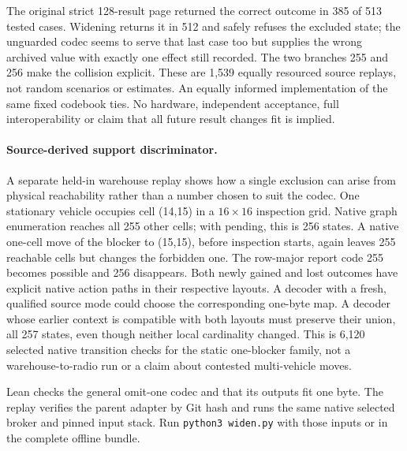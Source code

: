 \documentclass{article}
\begin{document}
The original strict 128-result page returned the correct outcome
in 385 of 513 tested cases. Widening returns it in 512 and safely
refuses the excluded state; the unguarded codec seems to serve that
last case too but supplies the wrong archived value with exactly
one effect still recorded. The two branches 255 and 256 make the
collision explicit. These are 1,539 equally resourced source replays,
not random scenarios or estimates. An equally informed implementation
of the same fixed codebook ties. No hardware, independent acceptance,
full interoperability or claim that all future result changes fit
is implied.

\paragraph{Source-derived support discriminator.}
A separate held-in warehouse replay shows how a single exclusion can
arise from physical reachability rather than a number chosen to suit
the codec. One stationary vehicle occupies cell (14,15) in a
\(16\times16\) inspection grid. Native graph enumeration reaches
all 255 other cells; with pending, this is 256 states. A native
one-cell move of the blocker to (15,15), before inspection starts,
again leaves 255 reachable cells but changes the forbidden one.
The row-major report code 255 becomes possible and 256 disappears.
Both newly gained and lost outcomes have explicit native action
paths in their respective layouts. A decoder with a fresh, qualified
source mode could choose the corresponding one-byte map. A
decoder whose earlier context is compatible with both layouts must
preserve their union, all 257 states, even though neither local
cardinality changed. This is 6,120 selected native transition checks
for the static one-blocker family, not a warehouse-to-radio run or
a claim about contested multi-vehicle moves.

Lean checks the general omit-one codec and that its outputs fit
one byte. The replay verifies the parent adapter by Git hash and
runs the same native selected broker and pinned input stack.
Run \texttt{python3 widen.py} with those inputs or in the complete
offline bundle.
\end{document}
